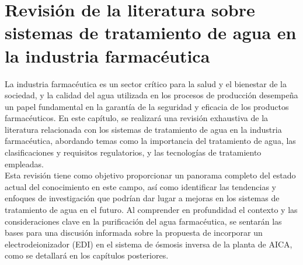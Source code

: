 \section{Revisión de la literatura sobre sistemas de tratamiento de agua en la industria farmacéutica}

La industria farmacéutica es un sector crítico para la salud y el bienestar de la sociedad, y la calidad del agua utilizada en los procesos de producción desempeña un papel fundamental en la garantía de la seguridad y eficacia de los productos farmacéuticos. En este capítulo, se realizará una revisión exhaustiva de la literatura relacionada con los sistemas de tratamiento de agua en la industria farmacéutica, abordando temas como la importancia del tratamiento de agua, las clasificaciones y requisitos regulatorios, y las tecnologías de tratamiento empleadas.\\

Esta revisión tiene como objetivo proporcionar un panorama completo del estado actual del conocimiento en este campo, así como identificar las tendencias y enfoques de investigación que podrían dar lugar a mejoras en los sistemas de tratamiento de agua en el futuro. Al comprender en profundidad el contexto y las consideraciones clave en la purificación del agua farmacéutica, se sentarán las bases para una discusión informada sobre la propuesta de incorporar un electrodeionizador (EDI) en el sistema de ósmosis inversa de la planta de AICA, como se detallará en los capítulos posteriores.








